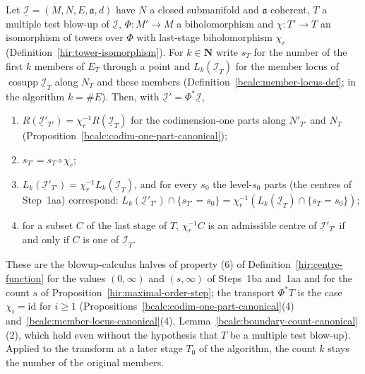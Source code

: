 \begin{proposition}
\label{bcalc:locus-tower-isomorphism}
\upstreamleanok
Let \(\underline{\mathcal I}=(M,N,E,\mathfrak a,d)\) have \(N\) a closed submanifold and \(\mathfrak a\) coherent, \(T\) a multiple test blow-up of \(\underline{\mathcal I}\), \(\Phi\colon M'\to M\) a
biholomorphism and \(\chi\colon T'\to T\) an isomorphism of towers over \(\Phi\) with last-stage biholomorphism \(\chi_r\) (Definition~\ref{hir:tower-isomorphism}). For
\(k\in\mathbf N\) write \(s_T\) for the number of the first \(k\) members of \(E_T\) through a point and \(L_k(\underline{\mathcal I}_T)\) for the member locus of
\(\operatorname{cosupp}\underline{\mathcal I}_T\) along \(N_T\) and these members (Definition~\ref{bcalc:member-locus-def}; in the algorithm \(k=\#E\)). Then, with
\(\underline{\mathcal I}'=\Phi^*\underline{\mathcal I}\),
\begin{enumerate}
\item \(R(\underline{\mathcal I}'_{T'})=\chi_r^{-1}R(\underline{\mathcal I}_T)\) for the codimension-one parts along \(N'_{T'}\) and \(N_T\) (Proposition~\ref{bcalc:codim-one-part-canonical});
\item \(s_{T'}=s_T\circ\chi_r\);
\item \(L_k(\underline{\mathcal I}'_{T'})=\chi_r^{-1}L_k(\underline{\mathcal I}_T)\), and for every \(s_0\) the level-\(s_0\) parts (the centres of Step~1aa) correspond:
\(L_k(\underline{\mathcal I}'_{T'})\cap\{s_{T'}=s_0\}=\chi_r^{-1}(L_k(\underline{\mathcal I}_T)\cap\{s_T=s_0\})\);
\item for a subset \(C\) of the last stage of \(T\), \(\chi_r^{-1}C\) is an admissible centre of \(\underline{\mathcal I}'_{T'}\) if and only if \(C\) is one of \(\underline{\mathcal I}_T\).
\end{enumerate}
These are the blowup-calculus halves of property (6) of Definition~\ref{hir:centre-function} for the values \((0,\infty)\) and \((s,\infty)\) of Steps~1ba and~1aa and for
the count \(s\) of Proposition~\ref{hir:maximal-order-step}; the transport \(\Phi^*T\) is the case \(\chi_i=\mathrm{id}\) for \(i\ge1\)
(Propositions~\ref{bcalc:codim-one-part-canonical}(4) and~\ref{bcalc:member-locus-canonical}(4), Lemma~\ref{bcalc:boundary-count-canonical}(2), which hold even without the
hypothesis that \(T\) be a multiple test blow-up). Applied to the transform at a later stage \(T_0\) of the algorithm, the count \(k\) stays the number of the original members.
\end{proposition}
